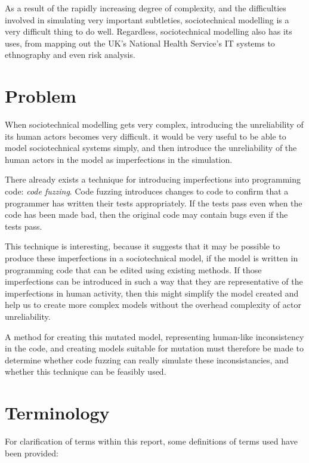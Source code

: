 As a result of the rapidly increasing degree of complexity, and the difficulties involved in simulating very important subtleties, sociotechnical modelling is a very difficult thing to do well. Regardless, sociotechnical modelling also has its uses, from mapping out the UK's National Health Service's IT systems\cite{Brennan2007} to ethnography\cite{Crabtree2000} and even risk analysis\cite{Storer2010}. \par

\section{Problem}
When sociotechnical modelling gets very complex, introducing the unreliability of its human actors becomes very difficult. it would be very useful to be able to model sociotechnical systems simply, and then introduce the unreliability of the human actors in the model as imperfections in the simulation. \par

There already exists a technique for introducing imperfections into programming code: \emph{code fuzzing}. Code fuzzing introduces changes to code to confirm that a programmer has written their tests appropriately. If the tests pass even when the code has been made bad, then the original code may contain bugs even if the tests pass. \par

This technique is interesting, because it suggests that it may be possible to produce these imperfections in a sociotechnical model, if the model is written in programming code that can be edited using existing methods. If those imperfections can be introduced in such a way that they are representative of the imperfections in human activity, then this might simplify the model created and help us to create more complex models without the overhead complexity of actor unreliability. \par

A method for creating this mutated model, representing human-like inconsistency in the code, and creating models suitable for mutation must therefore be made to determine whether code fuzzing can really simulate these inconsistancies, and whether this technique can be feasibly used. \par

\section{Terminology}
For clarification of terms within this report, some definitions of terms used have been provided: 
\label{introducing_technology}

